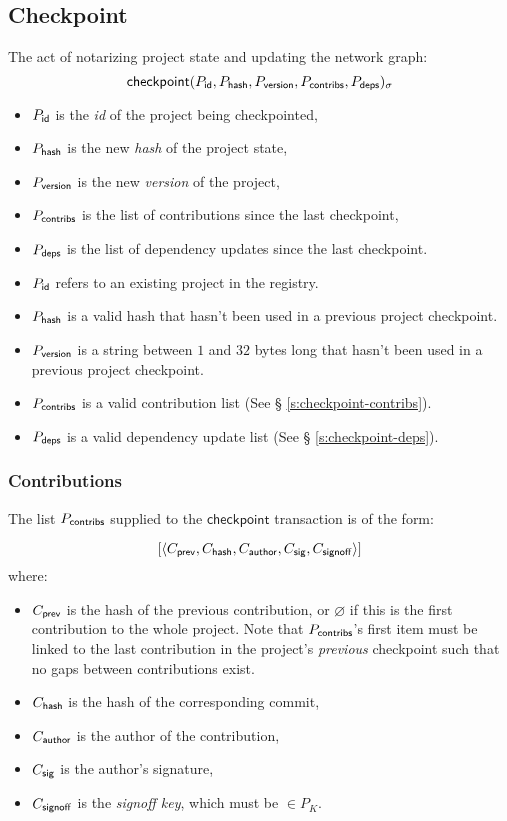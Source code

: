 \subsection{Checkpoint}
\label{s:checkpoint}
The act of notarizing project state and updating the network graph:
\[
    \mathsf{checkpoint}\lparen P_{\mathsf{id}}, P_{\mathsf{hash}}, P_{\mathsf{version}}, P_{\mathsf{contribs}}, P_{\mathsf{deps}}\rparen_\sigma
\]
\begin{itemize}
    \item $P_{\mathsf{id}}$ is the \emph{id} of the project being checkpointed,
    \item $P_{\mathsf{hash}}$ is the new \emph{hash} of the project state,
    \item $P_{\mathsf{version}}$ is the new \emph{version} of the project,
    \item $P_{\mathsf{contribs}}$ is the list of contributions since the last checkpoint,
    \item $P_{\mathsf{deps}}$ is the list of dependency updates since the last checkpoint.
\end{itemize}
\validation
\begin{itemize}
    \item{$P_{\mathsf{id}}$ refers to an existing project in the registry.}
    \item{$P_{\mathsf{hash}}$ is a valid hash that hasn't been used in a previous
        project checkpoint.}
    \item{$P_{\mathsf{version}}$ is a string between $1$ and $32$ bytes long that
        hasn't been used in a previous project checkpoint.}
    \item{$P_{\mathsf{contribs}}$ is a valid contribution list (See \S
        \ref{s:checkpoint-contribs}).}
    \item{$P_{\mathsf{deps}}$ is a valid dependency update list (See \S
        \ref{s:checkpoint-deps}).}
\end{itemize}

\subsubsection{Contributions}
The list $P_{\mathsf{contribs}}$ supplied to the $\mathsf{checkpoint}$
transaction is of the form:

\[
    [\langle C_{\mathsf{prev}}, C_{\mathsf{hash}}, C_{\mathsf{author}}, C_{\mathsf{sig}}, C_{\mathsf{signoff}}\rangle]
\]
where:
\begin{itemize}
\item $C_{\mathsf{prev}}$ is the hash of the previous contribution, or
  $\varnothing$ if this is the first contribution to the whole
  project. Note that $P_{\mathsf{contribs}}$'s first item must be linked to the last
  contribution in the project's \emph{previous} checkpoint such that no
  gaps between contributions exist.
\item $C_{\mathsf{hash}}$ is the hash of the corresponding commit,
\item $C_{\mathsf{author}}$ is the author of the contribution,
\item $C_{\mathsf{sig}}$ is the author's signature,
\item $C_{\mathsf{signoff}}$ is the \emph{signoff key}, which must be $\in P_K$.
\end{itemize}

